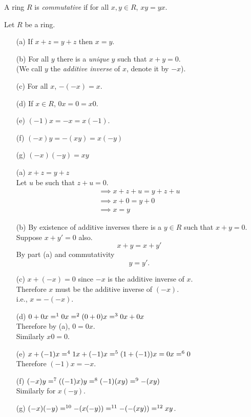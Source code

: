  A ring $R$ is \emph{commutative} if for all $x,y\in R$, $xy=yx$.

\prop Let $R$ be a ring.
\begin{enumerate}
\item[(a)] If $x+z=y+z$ then $x=y$.
\item[(b)] For all $y$ there is a \emph{unique} $y$ such that $x+y=0$. \\
(We call $y$ the \emph{additive inverse} of $x$, denote it by $-x$).
\item[(c)] For all $x$, $-(-x)=x$.
\item[(d)] If $x\in R$, $0x=0=x0$.
\item[(e)] $(-1)x=-x=x(-1)$.
\item[(f)] $(-x)y=-(xy)=x(-y)$
\item[(g)] $(-x)(-y)=xy$
\end{enumerate}
\pf
\begin{enumerate}
\item[(a)] $x+z=y+z$ \\
Let $u$ be such that $z+u=0$.
\begin{gather*}
\implies x+z+u = y+z+u \\
\implies x+0 = y+0 \\
\implies x = y
\end{gather*}
\item[(b)] By existence of additive inverses there is a $y\in R$ such that $x+y=0$.  Suppose $x+y'=0$ also.
\[ x+y=x+y' \]
By part (a) and commutativity
\[ y=y' . \]
\item[(c)] $x+(-x)=0$ since $-x$ is the additive inverse of $x$. \\
Therefore $x$ must be the additive inverse of $(-x)$. \\
i.e., $x=-(-x)$.
\item[(d)] $0+0x \mathrel{{=}\footnotemark}\footnotetext{neutrality of $0$} 0x \mathrel{{=}\footnotemark}\footnotetext{since $0=0+0$ by neutrality} (0+0)x \mathrel{{=}\footnotemark}\footnotetext{distributitivity} 0x + 0x$ \\
Therefore by (a), $0=0x$. \\
Similarly $x0=0$.
\item[(e)] $x+(-1)x\mathrel{{=}\footnotemark}\footnotetext{neutrality of $1$} 1x+(-1)x\mathrel{{=}\footnotemark}\footnotetext{distributivity} (1+(-1))x= 0x \mathrel{{=}\footnotemark}\footnotetext{(d)} 0$ \\
Therefore $(-1)x=-x$.
\item[(f)] $(-x)y\mathrel{{=}\footnotemark}\footnotetext{(e)} ((-1)x)y \mathrel{{=}\footnotemark}\footnotetext{associativity} (-1)(xy) \mathrel{{=}\footnotemark}\footnotetext{(e)} -(xy)$ \\
Similarly for $x(-y)$.
\item[(g)] $(-x)(-y) \mathrel{{=}\footnotemark}\footnotetext{(f)} -(x(-y)) \mathrel{{=}\footnotemark}\footnotetext{(f)} -(-(xy)) \mathrel{{=}\footnotemark}\footnotetext{(c)} xy$.
\end{enumerate}

